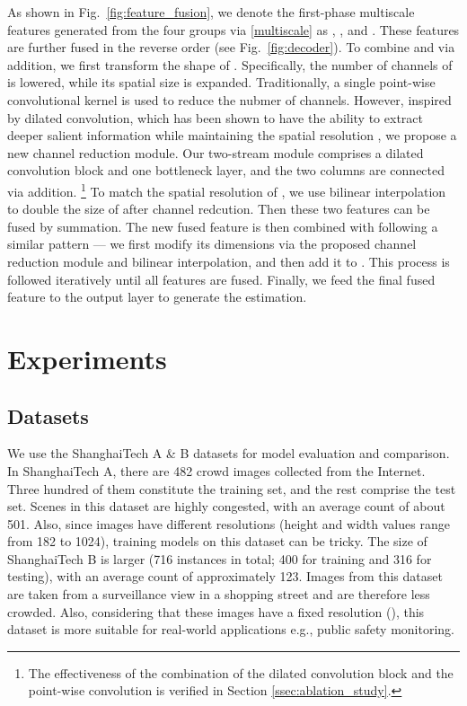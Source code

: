 \documentclass{article}
\begin{document}
As shown in Fig.~\ref{fig:feature_fusion}, we denote the first-phase multiscale features generated from the four groups via \eqref{multiscale} as , ,  and . These features are further fused in the reverse order (see Fig.~\ref{fig:decoder}). To combine  and  via addition, we first transform the shape of . Specifically, the number of channels of  is lowered, while its spatial size is expanded. Traditionally, a single point-wise convolutional kernel is used to reduce the nubmer of channels. However, inspired by dilated convolution, which has been shown to have the ability to extract deeper salient information while maintaining the spatial resolution \cite{CSRNet}, we propose a new channel reduction module. Our two-stream module comprises a dilated convolution block and one bottleneck layer, and the two columns are connected via addition. \footnote{The effectiveness of the combination of the dilated convolution block and the point-wise convolution is verified in Section \ref{ssec:ablation_study}.} To match the spatial resolution of , we use bilinear interpolation to double the size of   after channel redcution. Then these two features can be fused by summation. The new fused feature is then combined with  following a similar pattern --- we first modify its dimensions via the proposed channel reduction module and bilinear interpolation, and then add it to  . This process is followed iteratively until all features are fused. Finally, we feed the final fused feature to the output layer to generate the estimation.
  
\section{Experiments}
\label{sec:experiments}

\subsection{Datasets}
\label{ssec:datasets}

We use the ShanghaiTech A \& B datasets \cite{MCNN} for model evaluation and comparison. In ShanghaiTech A, there are 482 crowd images collected from the Internet. Three hundred of them constitute the training set, and the rest comprise the test set. Scenes in this dataset are highly congested, with an average count of about 501. Also, since images have different resolutions (height and width values range from 182 to 1024), training models on this dataset can be tricky. The size of ShanghaiTech B is larger (716 instances in total; 400 for training and 316 for testing), with an average count of approximately 123. Images from this dataset are taken from a surveillance view in a shopping street and are therefore less crowded. Also, considering that these images have a fixed resolution (), this dataset is more suitable for real-world applications e.g., public safety monitoring.
 
\end{document}
